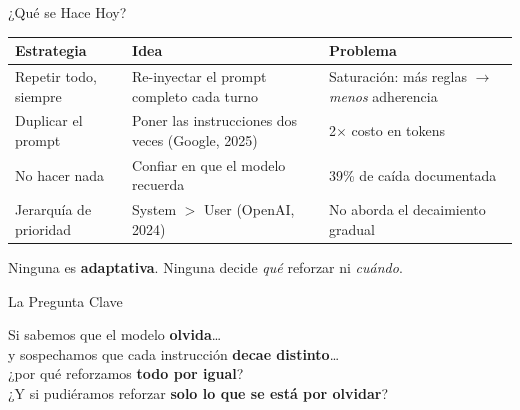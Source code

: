 \documentclass[aspectratio=169, 12pt]{beamer}
\begin{document}
\begin{frame}{¿Qu\'e se Hace Hoy?}

\renewcommand{\arraystretch}{1.4}
\begin{table}
\centering
\footnotesize
\begin{tabular}{@{} p{3.5cm} p{4.5cm} p{4.2cm} @{}}
\toprule
\textbf{Estrategia} & \textbf{Idea} & \textbf{Problema} \\
\midrule
Repetir todo, siempre &
    Re-inyectar el prompt completo cada turno &
    Saturaci\'on: m\'as reglas $\to$ \emph{menos} adherencia \\

Duplicar el prompt &
    Poner las instrucciones dos veces (Google, 2025) &
    2$\times$ costo en tokens \\

No hacer nada &
    Confiar en que el modelo recuerda &
    39\% de ca\'ida documentada \\

Jerarqu\'ia de prioridad &
    System $>$ User (OpenAI, 2024) &
    No aborda el decaimiento gradual \\
\bottomrule
\end{tabular}
\end{table}

\vspace{0.8em}

\begin{center}
Ninguna es \textbf{adaptativa}. \alert{Ninguna decide \emph{qu\'e} reforzar ni \emph{cu\'ando}.}
\end{center}

\end{frame}

\begin{frame}{La Pregunta Clave}

\begin{center}
\Large
Si sabemos que el modelo \textbf{olvida}\ldots\\[0.5em]
y sospechamos que cada instrucci\'on \textbf{decae distinto}\ldots\\[1em]
\pause
¿por qu\'e reforzamos \textbf{todo por igual}?\\[1.5em]
\pause
\normalsize
¿Y si pudi\'eramos reforzar \alert{\textbf{solo lo que se est\'a por olvidar}}?
\end{center}

\end{frame}
\end{document}
